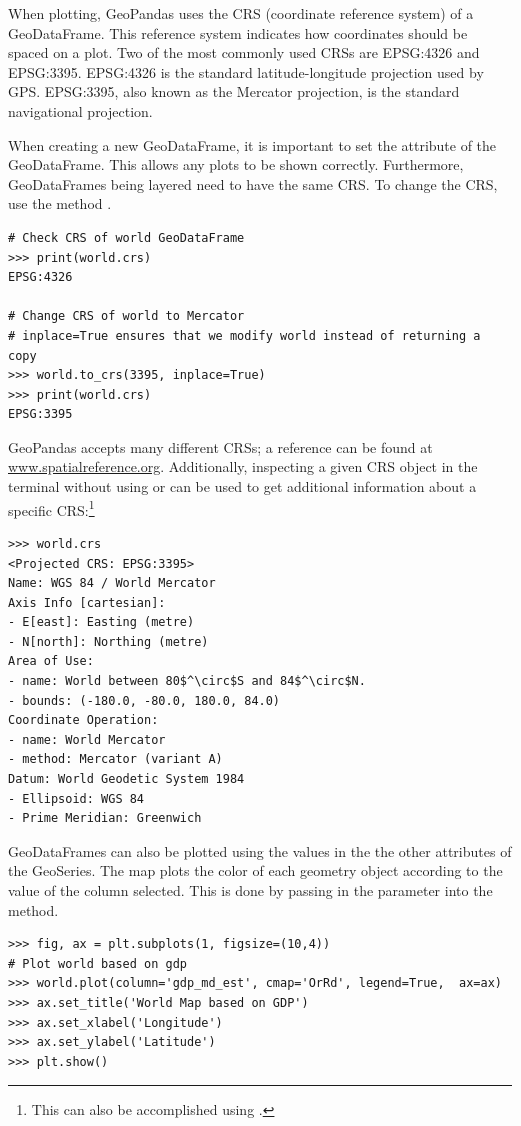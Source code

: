 When plotting, GeoPandas uses the CRS (coordinate reference system) of a GeoDataFrame.
This reference system indicates how coordinates should be spaced on a plot.
Two of the most commonly used CRSs are EPSG:4326 and EPSG:3395.
EPSG:4326 is the standard latitude-longitude projection used by GPS.
EPSG:3395, also known as the Mercator projection, is the standard navigational projection.

When creating a new GeoDataFrame, it is important to set the  attribute of the GeoDataFrame.
This allows any plots to be shown correctly.
Furthermore, GeoDataFrames being layered need to have the same CRS.
To change the CRS, use the method .

\begin{lstlisting}
# Check CRS of world GeoDataFrame
>>> print(world.crs)
EPSG:4326

# Change CRS of world to Mercator
# inplace=True ensures that we modify world instead of returning a copy
>>> world.to_crs(3395, inplace=True)
>>> print(world.crs)
EPSG:3395
\end{lstlisting}

GeoPandas accepts many different CRSs; a reference can be found at \url{www.spatialreference.org}.
Additionally, inspecting a given CRS object in the terminal without using  or  can be used to get additional information about a specific CRS:\footnote{This can also be accomplished using .}
\begin{lstlisting}[mathescape]
>>> world.crs
<Projected CRS: EPSG:3395>
Name: WGS 84 / World Mercator
Axis Info [cartesian]:
- E[east]: Easting (metre)
- N[north]: Northing (metre)
Area of Use:
- name: World between 80$^\circ$S and 84$^\circ$N.
- bounds: (-180.0, -80.0, 180.0, 84.0)
Coordinate Operation:
- name: World Mercator
- method: Mercator (variant A)
Datum: World Geodetic System 1984
- Ellipsoid: WGS 84
- Prime Meridian: Greenwich
\end{lstlisting}

GeoDataFrames can also be plotted using the values in the the other attributes of the GeoSeries.
The map plots the color of each geometry object according to the value of the column selected.
This is done by passing in the parameter  into the  method.

\begin{lstlisting}
>>> fig, ax = plt.subplots(1, figsize=(10,4))
# Plot world based on gdp
>>> world.plot(column='gdp_md_est', cmap='OrRd', legend=True,  ax=ax)
>>> ax.set_title('World Map based on GDP')
>>> ax.set_xlabel('Longitude')
>>> ax.set_ylabel('Latitude')
>>> plt.show()
\end{lstlisting}

